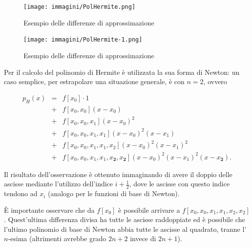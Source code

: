 \begin{figure}
\centering
\texttt{[image: immagini/PolHermite.png]}
\caption{\label{fig:PolHermite} Esempio delle differenze di approssimazione}
\end{figure}
\begin{figure}
\centering
\texttt{[image: immagini/PolHermite-1.png]}
\caption{\label{fig:PolHermite1} Esempio delle differenze di approssimazione}
\end{figure}

\begin{remark}
    Per il calcolo del polinomio di Hermite è utilizzata la sua forma di Newton: un caso semplice, per estrapolare una situazione generale, è con $n=2$, ovvero

    \begin{equation*}
        \begin{matrix}
            p_H(x)&=& f[x_0]\cdot 1\\
            &+& f[x_0,x_0](x-x_0)\\
            &+& f[x_0,x_0,x_1](x-x_0)^2\\
            &+& f[x_0,x_0,x_1,x_1](x-x_0)^2(x-x_1)\\
            &+& f[x_0,x_0,x_1,x_1,x_2](x-x_0)^2(x-x_1)^2\\
            &+& f[x_0,x_0,x_1,x_1,x_{\boldsymbol 2},x_{\boldsymbol 2}](x-x_0)^2(x-x_1)^2(x-x_{\boldsymbol 2}).
        \end{matrix}
    \end{equation*}
\end{remark}

Il risultato dell'osservazione è ottenuto immaginando di avere il doppio delle ascisse mediante l'utilizzo dell'indice $i+\frac{1}{2}$, dove le ascisse con questo indice tendono ad $x_i$ (analogo per le funzioni di base di Newton).
    
È importante osservare che da $f[x_0]$ è possibile arrivare a $f[x_0,x_0,x_1,x_1,x_2,x_2]$. Quest'ultima differenza divisa ha tutte le ascisse raddoppiate ed è possibile che l'ultimo polinomio di base di Newton abbia tutte le ascisse al quadrato, tranne l'$n$-esima (altrimenti avrebbe grado $2n+2$ invece di $2n+1$).

